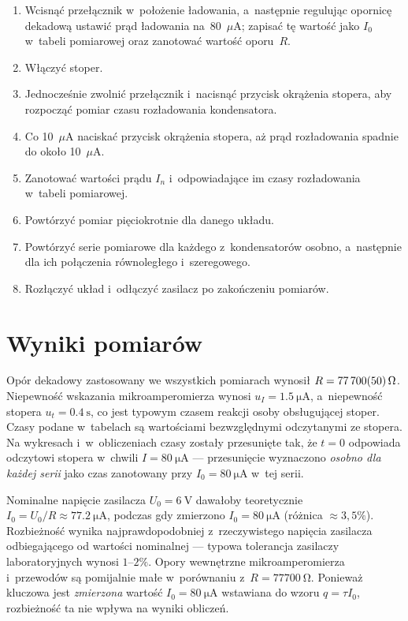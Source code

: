 \documentclass[12pt, a4paper]{article}
\begin{document}
\begin{enumerate}
    \item Wcisnąć przełącznik w~położenie ładowania, a~następnie regulując
          opornicę dekadową ustawić prąd ładowania na~80~$\mu$A\@; zapisać tę
          wartość jako $I_0$ w~tabeli pomiarowej oraz zanotować wartość oporu~$R$.
    \item Włączyć stoper.
    \item Jednocześnie zwolnić przełącznik i~nacisnąć przycisk okrążenia stopera,
          aby rozpocząć pomiar czasu rozładowania kondensatora.
    \item Co 10~$\mu$A naciskać przycisk okrążenia stopera, aż prąd rozładowania
          spadnie do około 10~$\mu$A.
    \item Zanotować wartości prądu $I_n$ i~odpowiadające im czasy rozładowania
          w~tabeli pomiarowej.
    \item Powtórzyć pomiar pięciokrotnie dla danego układu.
    \item Powtórzyć serie pomiarowe dla każdego z~kondensatorów osobno, a~następnie
          dla ich połączenia równoległego i~szeregowego.
    \item Rozłączyć układ i~odłączyć zasilacz po zakończeniu pomiarów.
\end{enumerate}



\section{Wyniki pomiarów}

Opór dekadowy zastosowany we wszystkich pomiarach wynosił
$R = \SI{77700 \pm 50}{\ohm}$.
Niepewność wskazania mikroamperomierza wynosi $u_I = \SI{1,5}{\micro\ampere}$,
a~niepewność stopera $u_t = \SI{0,4}{\second}$, co jest typowym czasem reakcji osoby obsługującej stoper.
Czasy podane w~tabelach są wartościami bezwzględnymi odczytanymi ze stopera.
Na wykresach i~w~obliczeniach czasy zostały przesunięte tak, że $t = 0$
odpowiada odczytowi stopera w~chwili $I = \SI{80}{\micro\ampere}$ --- przesunięcie
wyznaczono \emph{osobno dla każdej serii} jako czas zanotowany przy $I_0 = \SI{80}{\micro\ampere}$
w~tej serii.

Nominalne napięcie zasilacza $U_0 = \SI{6}{\volt}$ dawałoby teoretycznie
$I_0 = U_0/R \approx \SI{77,2}{\micro\ampere}$, podczas gdy zmierzono
$I_0 = \SI{80}{\micro\ampere}$ (różnica $\approx 3{,}5\%$). Rozbieżność
wynika najprawdopodobniej z~rzeczywistego napięcia zasilacza odbiegającego
od wartości nominalnej --- typowa tolerancja zasilaczy laboratoryjnych wynosi
$1$--$2\%$. Opory wewnętrzne mikroamperomierza i~przewodów są pomijalnie małe
w~porównaniu z~$R = \SI{77700}{\ohm}$. Ponieważ kluczowa jest \emph{zmierzona}
wartość $I_0 = \SI{80}{\micro\ampere}$ wstawiana do wzoru $q = \tau I_0$,
rozbieżność ta nie wpływa na wyniki obliczeń.
\end{document}
